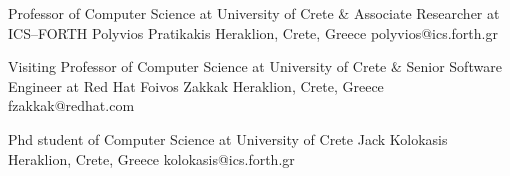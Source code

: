 


\begin{cventries}

  \cventry
    {Professor of Computer Science at University of Crete \& Associate Researcher at ICS--FORTH} %
    {Polyvios Pratikakis} %
    {Heraklion, Crete, Greece} %
    {} %
    {
        polyvios@ics.forth.gr
    }

  \cventry
    {Visiting Professor of Computer Science at University of Crete \& Senior Software Engineer at Red Hat} %
    {Foivos Zakkak} %
    {Heraklion, Crete, Greece} %
    {} %
    {
        fzakkak@redhat.com
    }

  \cventry
    {Phd student of Computer Science at University of Crete} %
    {Jack Kolokasis} %
    {Heraklion, Crete, Greece} %
    {} %
    {
        kolokasis@ics.forth.gr
    }


\end{cventries}

